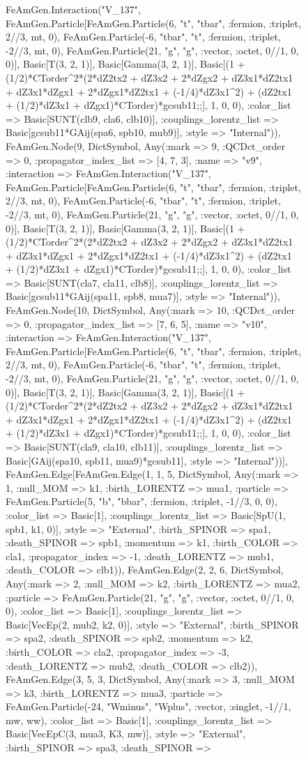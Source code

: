 \documentclass{revtex4}
\begin{document}
\begin{figure}[!htb]
\begin{center}
{FeAmGen.Interaction("V_137", FeAmGen.Particle[FeAmGen.Particle(6, "t", "tbar", :fermion, :triplet, 2//3, mt, 0), FeAmGen.Particle(-6, "tbar", "t", :fermion, :triplet, -2//3, mt, 0), FeAmGen.Particle(21, "g", "g", :vector, :octet, 0//1, 0, 0)], Basic[T(3, 2, 1)], Basic[Gamma(3, 2, 1)], Basic[(1 + (1/2)*CTorder^2*(2*dZ2tx2 + dZ3x2 + 2*dZgx2 + dZ3x1*dZ2tx1 + dZ3x1*dZgx1 + 2*dZgx1*dZ2tx1 + (-1/4)*dZ3x1^2) + (dZ2tx1 + (1/2)*dZ3x1 + dZgx1)*CTorder)*gcsub11;;], 1, 0, 0), :color_list => Basic[SUNT(clb9, cla6, clb10)], :couplings_lorentz_list => Basic[gcsub11*GAij(spa6, spb10, mub9)], :style => "Internal")), FeAmGen.Node(9, Dict{Symbol, Any}(:mark => 9, :QCDct_order => 0, :propagator_index_list => [4, 7, 3], :name => "v9", :interaction => FeAmGen.Interaction("V_137", FeAmGen.Particle[FeAmGen.Particle(6, "t", "tbar", :fermion, :triplet, 2//3, mt, 0), FeAmGen.Particle(-6, "tbar", "t", :fermion, :triplet, -2//3, mt, 0), FeAmGen.Particle(21, "g", "g", :vector, :octet, 0//1, 0, 0)], Basic[T(3, 2, 1)], Basic[Gamma(3, 2, 1)], Basic[(1 + (1/2)*CTorder^2*(2*dZ2tx2 + dZ3x2 + 2*dZgx2 + dZ3x1*dZ2tx1 + dZ3x1*dZgx1 + 2*dZgx1*dZ2tx1 + (-1/4)*dZ3x1^2) + (dZ2tx1 + (1/2)*dZ3x1 + dZgx1)*CTorder)*gcsub11;;], 1, 0, 0), :color_list => Basic[SUNT(cla7, cla11, clb8)], :couplings_lorentz_list => Basic[gcsub11*GAij(spa11, spb8, mua7)], :style => "Internal")), FeAmGen.Node(10, Dict{Symbol, Any}(:mark => 10, :QCDct_order => 0, :propagator_index_list => [7, 6, 5], :name => "v10", :interaction => FeAmGen.Interaction("V_137", FeAmGen.Particle[FeAmGen.Particle(6, "t", "tbar", :fermion, :triplet, 2//3, mt, 0), FeAmGen.Particle(-6, "tbar", "t", :fermion, :triplet, -2//3, mt, 0), FeAmGen.Particle(21, "g", "g", :vector, :octet, 0//1, 0, 0)], Basic[T(3, 2, 1)], Basic[Gamma(3, 2, 1)], Basic[(1 + (1/2)*CTorder^2*(2*dZ2tx2 + dZ3x2 + 2*dZgx2 + dZ3x1*dZ2tx1 + dZ3x1*dZgx1 + 2*dZgx1*dZ2tx1 + (-1/4)*dZ3x1^2) + (dZ2tx1 + (1/2)*dZ3x1 + dZgx1)*CTorder)*gcsub11;;], 1, 0, 0), :color_list => Basic[SUNT(cla9, cla10, clb11)], :couplings_lorentz_list => Basic[GAij(spa10, spb11, mua9)*gcsub11], :style => "Internal"))], FeAmGen.Edge[FeAmGen.Edge(1, 1, 5, Dict{Symbol, Any}(:mark => 1, :null_MOM => k1, :birth_LORENTZ => mua1, :particle => FeAmGen.Particle(5, "b", "bbar", :fermion, :triplet, -1//3, 0, 0), :color_list => Basic[1], :couplings_lorentz_list => Basic[SpU(1, spb1, k1, 0)], :style => "External", :birth_SPINOR => spa1, :death_SPINOR => spb1, :momentum => k1, :birth_COLOR => cla1, :propagator_index => -1, :death_LORENTZ => mub1, :death_COLOR => clb1)), FeAmGen.Edge(2, 2, 6, Dict{Symbol, Any}(:mark => 2, :null_MOM => k2, :birth_LORENTZ => mua2, :particle => FeAmGen.Particle(21, "g", "g", :vector, :octet, 0//1, 0, 0), :color_list => Basic[1], :couplings_lorentz_list => Basic[VecEp(2, mub2, k2, 0)], :style => "External", :birth_SPINOR => spa2, :death_SPINOR => spb2, :momentum => k2, :birth_COLOR => cla2, :propagator_index => -3, :death_LORENTZ => mub2, :death_COLOR => clb2)), FeAmGen.Edge(3, 5, 3, Dict{Symbol, Any}(:mark => 3, :null_MOM => k3, :birth_LORENTZ => mua3, :particle => FeAmGen.Particle(-24, "Wminus", "Wplus", :vector, :singlet, -1//1, mw, ww), :color_list => Basic[1], :couplings_lorentz_list => Basic[VecEpC(3, mua3, K3, mw)], :style => "External", :birth_SPINOR => spa3, :death_SPINOR => }
\end{center}
\end{figure}
\end{document}
